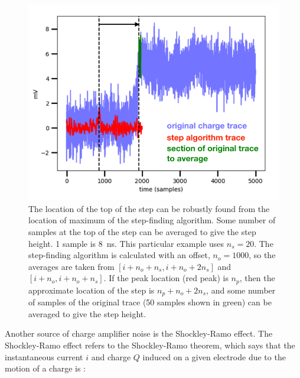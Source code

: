  \begin{figure}[htbp]
\begin{center}
\includegraphics[width =\textwidth ]{figures/testbed/charge_algorithm.png}
\caption{The location of the top of the step can be robustly found from the location of maximum of the step-finding algorithm. Some number of samples at the top of the step can be averaged to give the step height. 1 sample is 8~ns. This particular example uses $n_{s}=20$. The step-finding algorithm is calculated with an offset, $n_{o}=1000$, so the averages are taken from $[i+n_{o}+n_{s},i+n_{o}+2n_{s}]$ and $[i+n_{o},i+n_{o}+n_{s}]$. If the peak location (red peak) is $n_{p}$, then the approximate location of the step is $n_{p} + n_{o} + 2n_{s}$, and some number of samples of the original trace (50 samples shown in green) can be averaged to give the step height. }
\label{fig:charge_algorithm}
\end{center}
\end{figure}


Another source of charge amplifier noise is the Shockley-Ramo effect. The Shockley-Ramo effect refers to the Shockley-Ramo theorem, which says that the instantaneous current $i$ and charge $Q$ induced on a given electrode due to the motion of a charge is \cite{He2001}:

